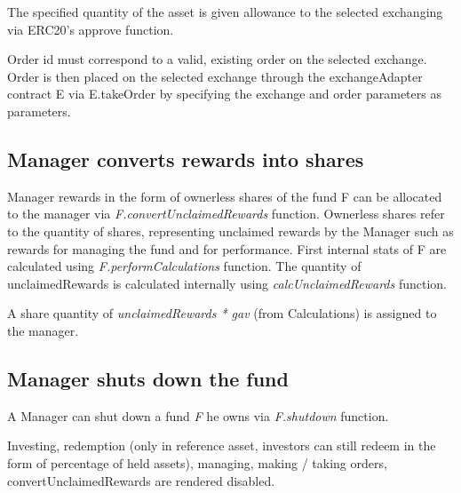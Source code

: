 \documentclass[conference]{IEEEtran}
\begin{document}
The specified quantity of the asset is given allowance to the selected exchanging via ERC20's approve function.

Order id must correspond to a valid, existing order on the selected exchange. Order is then placed on the selected exchange through the exchangeAdapter contract E via E.takeOrder by specifying the exchange and order parameters as parameters.

\subsection{Manager converts rewards into shares}

Manager rewards in the form of ownerless shares of the fund F can be allocated to the manager via \textit{F.convertUnclaimedRewards} function. Ownerless shares refer to the quantity of shares, representing unclaimed rewards by the Manager such as rewards for managing the fund and for performance. First internal stats of F are calculated using \textit{F.performCalculations} function. The quantity of unclaimedRewards is calculated internally using \textit{calcUnclaimedRewards} function.

A share quantity of \textit{unclaimedRewards * gav} (from Calculations) is assigned to the manager.

\subsection{Manager shuts down the fund}

A Manager can shut down a fund \textit{F} he owns via \textit{F.shutdown} function.

Investing, redemption (only in reference asset, investors can still redeem in the form of percentage of held assets), managing, making / taking orders, convertUnclaimedRewards are rendered disabled.
%
%
\end{document}
